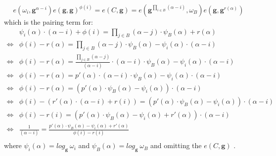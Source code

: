 $$e(\omega_i,\mathbf{g}^{\alpha-i})e(\mathbf{g}, \mathbf{g})^{\phi(i)} = e(C,\mathbf{g}) = e(\mathbf{g}^{\prod_{i\in B}^{}(\alpha-i)}, \omega_B)e(\mathbf{g}, \mathbf{g}^{r(\alpha)})$$
which is the pairing term for: 
\begin{equation*}
    \begin{aligned}
        &\psi_i(\alpha) \cdot (\alpha-i) + \phi(i) = \prod_{j\in B}^{}(\alpha-j) \cdot \psi_B(\alpha) + r(\alpha) \\
        \iff&\phi(i) - r(\alpha) = \prod_{j\in B}^{}(\alpha-j) \cdot \psi_B(\alpha) - \psi_i(\alpha) \cdot (\alpha-i)\\
        \iff&\phi(i) - r(\alpha) = \frac{\prod_{j\in B}^{}(\alpha-j)}{(\alpha-i)} \cdot (\alpha-i) \cdot \psi_B(\alpha) - \psi_i(\alpha) \cdot (\alpha-i)\\
        \iff&\phi(i) - r(\alpha) = p'(\alpha) \cdot (\alpha-i) \cdot \psi_B(\alpha) - \psi_i(\alpha) \cdot (\alpha-i)\\
        \iff&\phi(i) - r(\alpha) = (p'(\alpha) \cdot \psi_B(\alpha) - \psi_i(\alpha)) \cdot (\alpha-i)\\
        \iff&\phi(i) - (r'(\alpha) \cdot (\alpha-i) + r(i)) = (p'(\alpha) \cdot \psi_B(\alpha) - \psi_i(\alpha)) \cdot (\alpha-i)\\
        \iff&\phi(i) - r(i) = (p'(\alpha) \cdot \psi_B(\alpha) - \psi_i(\alpha) + r'(\alpha)) \cdot (\alpha-i)\\
        \iff&\frac{1}{(\alpha-i)} = \frac{p'(\alpha) \cdot \psi_B(\alpha) - \psi_i(\alpha) + r'(\alpha)}{\phi(i) - r(i)}\\
    \end{aligned}
\end{equation*}
where $\psi_i(\alpha)= log_{\mathbf{g}}\ \omega_i$ and $\psi_B(\alpha)= log_{\mathbf{g}}\ \omega_B$ and omitting the $e(C,\mathbf{g})$
\parencite{KZG}.

